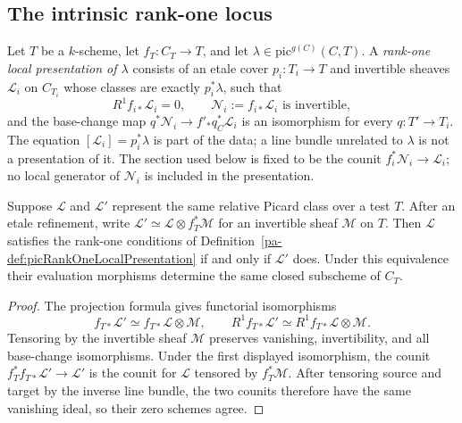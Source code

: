 \subsection{The intrinsic rank-one locus}

\begin{definition}
  \label{pa-def:picRankOneLocalPresentation}
  \leanok

  Let \(T\) be a \(k\)-scheme, let \(f_T\colon C_T\to T\), and let
  \(\lambda\in\mathrm{pic}^{g(C)}(C,T)\).  A \emph{rank-one local presentation of
  \(\lambda\)} consists of an etale cover \(p_i\colon T_i\to T\) and invertible sheaves
  \(\mathcal L_i\) on \(C_{T_i}\) whose classes are exactly
  \(p_i^*\lambda\), such that
  \[
    R^1f_{i*}\mathcal L_i=0,
    \qquad \mathcal N_i:=f_{i*}\mathcal L_i\text{ is invertible},
  \]
  and the base-change map
  \(q^*\mathcal N_i\to f'_*q_C^*\mathcal L_i\) is an isomorphism for every
  \(q\colon T'\to T_i\).  The equation
  \([\mathcal L_i]=p_i^*\lambda\) is part of the data; a line bundle unrelated to
  \(\lambda\) is not a presentation of it.  The section used below is fixed to be the
  counit \(f_i^*\mathcal N_i\to\mathcal L_i\); no local generator of \(\mathcal N_i\) is
  included in the presentation.
\end{definition}

\begin{lemma}
  \label{pa-lem:picRankOnePresentation_change}
  \notready
  Suppose \(\mathcal L\) and \(\mathcal L'\) represent the same relative Picard class over a
  test \(T\).  After an etale refinement, write
  \(\mathcal L'\simeq\mathcal L\otimes f_T^*\mathcal M\) for an invertible sheaf
  \(\mathcal M\) on \(T\).  Then \(\mathcal L\) satisfies the rank-one conditions of
  Definition~\ref{pa-def:picRankOneLocalPresentation} if and only if \(\mathcal L'\) does.
  Under this equivalence their evaluation morphisms determine the same closed subscheme of
  \(C_T\).
\end{lemma}
\begin{proof}
  The projection formula gives functorial isomorphisms
  \[
    f_{T*}\mathcal L'\simeq f_{T*}\mathcal L\otimes\mathcal M,
    \qquad
    R^1f_{T*}\mathcal L'\simeq R^1f_{T*}\mathcal L\otimes\mathcal M.
  \]
  Tensoring by the invertible sheaf \(\mathcal M\) preserves vanishing, invertibility, and
  all base-change isomorphisms.  Under the first displayed isomorphism, the counit
  \(f_T^*f_{T*}\mathcal L'\to\mathcal L'\) is the counit for \(\mathcal L\) tensored by
  \(f_T^*\mathcal M\).  After tensoring source and target by the inverse line bundle, the two
  counits therefore have the same vanishing ideal, so their zero schemes agree.
\end{proof}

